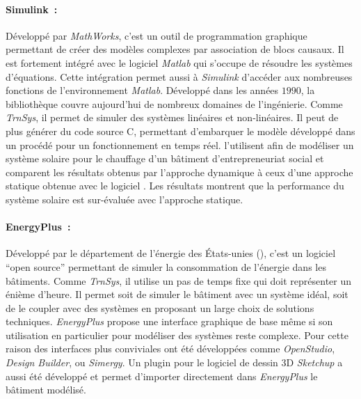 \paragraph{Simulink~:} %
\label{par:simulink}
Développé par \textit{MathWorks}, c’est un outil de programmation graphique permettant de
créer des modèles complexes par association de blocs causaux. Il est fortement intégré
avec le logiciel \textit{Matlab} qui s’occupe de résoudre les systèmes d’équations. Cette
intégration permet aussi à  \textit{Simulink} d’accéder aux nombreuses fonctions de
l’environnement \textit{Matlab}.
Développé dans les années $1990$, la bibliothèque couvre
aujourd’hui de nombreux domaines de l’ingénierie. Comme \textit{TrnSys}, il permet de
simuler des systèmes linéaires et non-linéaires. Il peut de plus générer du code source C,
permettant d’embarquer le modèle développé dans un procédé pour un fonctionnement en temps
réel. \textcite{Mosallat2013686} l’utilisent afin de modéliser un système solaire pour le
chauffage d’un bâtiment d’entrepreneuriat social et comparent les résultats obtenus par
l’approche dynamique à ceux d’une approche statique obtenue avec le logiciel
. Les résultats montrent que la performance
du système solaire est sur-évaluée avec l’approche statique.

\paragraph{EnergyPlus~:} %
\label{par:energyplus}
Développé par le département de l’énergie des États-unies (), c’est un logiciel
\enquote{open source} permettant de simuler la consommation de l’énergie dans les
bâtiments. Comme \textit{TrnSys}, il utilise un pas de temps fixe qui doit représenter
un énième d’heure. Il permet soit de simuler le bâtiment avec un système
idéal, soit de le coupler avec des systèmes en proposant un large choix de solutions
techniques. \textit{EnergyPlus} propose une interface graphique de base même si son
utilisation en particulier pour modéliser des systèmes reste complexe. Pour cette raison
des interfaces plus conviviales ont été développées comme \textit{OpenStudio},
\textit{Design Builder}, ou \textit{Simergy}. Un plugin pour le
logiciel de dessin $3$D \textit{Sketchup} a aussi été développé et permet d’importer
directement dans \textit{EnergyPlus} le bâtiment modélisé.

